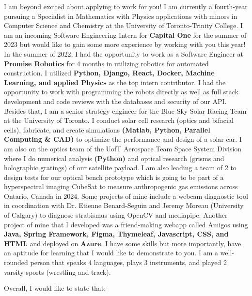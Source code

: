 \documentclass[11pt,a4]{article}
\begin{document}
I am beyond excited about applying to work for you! 
I am currently a fourth-year pursuing a Specialist in
 Mathematics with Physics applications with minors 
 in Computer Science and Chemistry at the University
  of Toronto-Trinity College. I am an incoming Software Engineering Intern for 
  \textbf{Capital One} for the summer of 2023 but would like to
   gain some more experience by working with you this year! 
   In the summer of 2022, I had the opportunity to work as
    a Software Engineer at \textbf{Promise Robotics} for 4 months in 
    utilizing robotics for automated construction. 
    I utilized \textbf{Python, Django, React, Docker, Machine 
    Learning, and applied Physics} as the top intern 
    contributor.  I had the opportunity to work
        with programming the robots directly as well as full 
        stack development and code reviews with the databases and security of
         our API. Besides that, I am a senior strategy 
         engineer for the Blue Sky Solar Racing Team at 
         the University of Toronto. I conduct solar cell
          research (optics and bifacial cells), fabricate,
           and create simulations \textbf{(Matlab, Python, Parallel 
           Computing \& CAD)} to optimize the performance and
            design of a solar car. I am also on the optics 
            team of the UofT Aerospace Team Space System
             Division where I do numerical analysis \textbf{(Python)} 
             and optical research (grisms and holographic 
             gratings) of our satellite payload. I am also leading a team of 2 to 
             design tests for our optical bench prototype
              which is going to be part of a hyperspectral 
              imaging CubeSat to measure anthropogenic gas 
              emissions across Ontario, Canada in 2024.
               Some projects of mine include a webcam 
               diagnostic tool in coordination with Dr.
                Etienne Benard-Seguin and Jeremy Moreau
                 (University of Calgary) to diagnose 
                 strabismus using OpenCV and mediapipe. 
                 Another project of mine that I developed
                  was a friend-making webapp called Amigos
                   using \textbf{Java, Spring Framework, Figma, Thymeleaf, Javascript, CSS, and HTML} and deployed on \textbf{Azure}.
                    I have some skills but more importantly,
                     have an aptitude for learning that I 
                     would like to demonstrate to you. I am
                      a well-rounded person that speaks 4
                      languages, plays 3 instruments, and 
                      played 2 varsity sports (wrestling and 
                      track). \par
     Overall, I would like to state that:
\end{document}

